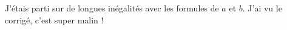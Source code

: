 J'étais parti sur de longues inégalités avec les formules de $a$ et $b$. J'ai vu le corrigé, c'est super malin !
